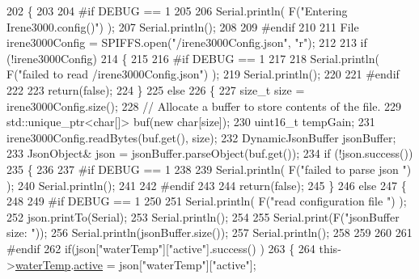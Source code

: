 \begin{DoxyCode}
202 \{
203 
204 \textcolor{preprocessor}{#if DEBUG == 1 }
205 
206     Serial.println( F(\textcolor{stringliteral}{"Entering Irene3000.config()"}) );
207     Serial.println();
208 
209 \textcolor{preprocessor}{#endif}
210 
211     File irene3000Config = SPIFFS.open(\textcolor{stringliteral}{"/irene3000Config.json"}, \textcolor{stringliteral}{"r"});
212 
213     \textcolor{keywordflow}{if} (!irene3000Config) 
214     \{
215     
216 \textcolor{preprocessor}{    #if DEBUG == 1 }
217 
218         Serial.println( F(\textcolor{stringliteral}{"failed to read /irene3000Config.json"}) );
219         Serial.println();
220     
221 \textcolor{preprocessor}{    #endif}
222 
223         \textcolor{keywordflow}{return}(\textcolor{keyword}{false});
224     \}
225     \textcolor{keywordflow}{else}
226     \{
227         \textcolor{keywordtype}{size\_t} size = irene3000Config.size();
228         \textcolor{comment}{// Allocate a buffer to store contents of the file.}
229         std::unique\_ptr<char[]> buf(\textcolor{keyword}{new} \textcolor{keywordtype}{char}[size]);
230             uint16\_t tempGain;
231         irene3000Config.readBytes(buf.get(), size);
232         DynamicJsonBuffer jsonBuffer;
233         JsonObject& json = jsonBuffer.parseObject(buf.get());
234         \textcolor{keywordflow}{if} (!json.success()) 
235         \{
236         
237 \textcolor{preprocessor}{        #if DEBUG == 1 }
238 
239             Serial.println( F(\textcolor{stringliteral}{"failed to parse json "}) );
240             Serial.println();
241         
242 \textcolor{preprocessor}{        #endif}
243             
244             \textcolor{keywordflow}{return}(\textcolor{keyword}{false});
245         \} 
246         \textcolor{keywordflow}{else}
247         \{
248         
249 \textcolor{preprocessor}{        #if DEBUG == 1 }
250     
251             Serial.println( F(\textcolor{stringliteral}{"read configuration file "}) );
252             json.printTo(Serial);
253             Serial.println();
254 
255             Serial.print(F(\textcolor{stringliteral}{"jsonBuffer size: "}));
256             Serial.println(jsonBuffer.size());
257             Serial.println();
258 
259         
260 
261 \textcolor{preprocessor}{        #endif          }
262             \textcolor{keywordflow}{if}(json[\textcolor{stringliteral}{"waterTemp"}][\textcolor{stringliteral}{"active"}].success() )
263             \{           
264                 this->\hyperlink{class_irene3000_af05612c78c758ce9db316c75ad937130}{waterTemp}.\hyperlink{struct_irene3000_1_1state_a879828ace7e7a7bc91ff703bfee36599}{active} = json[\textcolor{stringliteral}{"waterTemp"}][\textcolor{stringliteral}{"active"}]; 

\end{DoxyCode}
